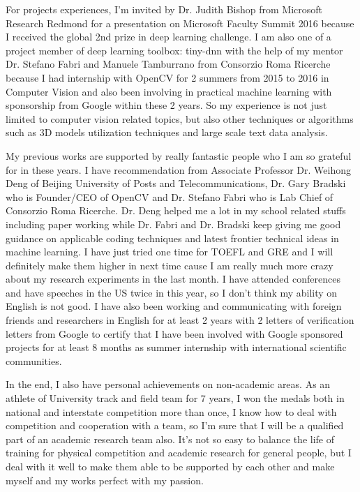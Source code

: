\documentclass[11pt, a4paper]{awesome-cv} %
\begin{document}
For projects experiences, I’m invited by Dr. Judith Bishop from Microsoft Research Redmond for a presentation on Microsoft Faculty Summit 2016 because I received the global 2nd prize in deep learning challenge. I am also one of a project member of deep learning toolbox: tiny-dnn with the help of my mentor Dr. Stefano Fabri and Manuele Tamburrano from Consorzio Roma Ricerche because I had internship with OpenCV for 2 summers from 2015 to 2016 in Computer Vision and also been involving in practical machine learning with sponsorship from Google within these 2 years. So my experience is not just limited to computer vision related topics, but also other techniques or algorithms such as 3D models utilization techniques and large scale text data analysis.

My previous works are supported by really fantastic people who I am so grateful for in these years. I have recommendation from Associate Professor Dr. Weihong Deng of Beijing University of Posts and Telecommunications, Dr. Gary Bradski who is Founder/CEO of OpenCV and Dr. Stefano Fabri who is Lab Chief of Consorzio Roma Ricerche. Dr. Deng helped me a lot in my school related stuffs including paper working while Dr. Fabri and Dr. Bradski keep giving me good guidance on applicable coding techniques and latest frontier technical ideas in machine learning. I have just tried one time for TOEFL and GRE and I will definitely make them higher in next time cause I am really much more crazy about my research experiments in the last month. I have attended conferences and have speeches in the US twice in this year, so I don't think my ability on English is not good. I have also been working and communicating with foreign friends and researchers in English for at least 2 years with 2 letters of verification letters from Google to certify that I have been involved with Google sponsored projects for at least 8 months as summer internship with international scientific communities.

In the end, I also have personal achievements on non-academic areas. As an athlete of University track and field team for 7 years, I won the medals both in national and interstate competition more than once, I know how to deal with competition and cooperation with a team, so I'm sure that I will be a qualified part of an academic research team also. It's not so easy to balance the life of training for physical competition and academic research for general people, but I deal with it well to make them able to be supported by each other and make myself and my works perfect with my passion.

\end{document}
